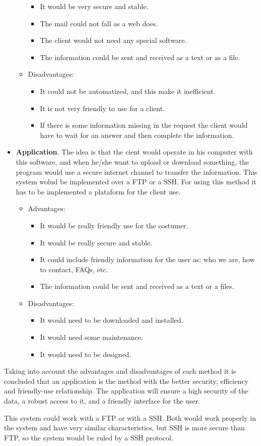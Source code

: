 \begin{itemize}
\begin{itemize}
\begin{itemize}
\item It would be very secure and stable.
\item The mail could not fall as a web does.
\item The client would not need any special software.
\item The information could be sent and received as a text or as a file.
\end{itemize}
\item Disadvantages: 
\begin{itemize}
\item It could not be automatized, and this make it inefficient.
\item It is not very friendly to use for a client.
\item If there is some information missing in the request the client would have to wait for an answer and then complete the information. 
\end{itemize}
\end{itemize}
\item \textbf{Application}.  The idea is that the cient would operate in his computer with this software, and when he/she want to upload or download something, the program would use a secure internet channel to transfer the information. This system wolud be implemented over a FTP or a SSH. For using this method it has to be implemented a plataform for the client use.
\begin{itemize}
\item Advantages:
\begin{itemize}
\item It would be really friendly use for the costumer.
\item It would be really secure and stable.
\item It could include friendly information for the user as: who we are, how to contact, FAQs, etc.
\item The information could be sent and received as a text or a files.
\end{itemize}
\item Disadvantages:
\begin{itemize}
\item It would need to be downloaded and installed.
\item It would need some maintenance.
\item It would need to be designed.
\end{itemize}
\end{itemize}
\end{itemize}

Taking into account the advantages and disadvantages of each method it is concluded that an application is the method with the better security, efficiency and friendly-use relationship. The application will ensure a high security of the data, a robust access to it, and a friendly interface for the user.

This system could work with a FTP or with a SSH. Both would work properly in the system and have very similar characteristics, but SSH is more secure than FTP, so the system would be ruled by a SSH protocol.